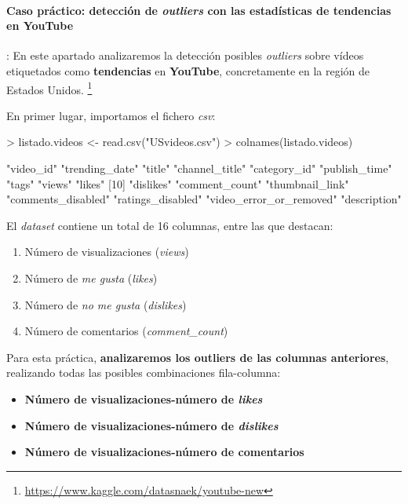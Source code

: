 \documentclass [a4paper] {article}
\begin{document}
\paragraph{Caso práctico: detección de \textit{outliers} con las estadísticas de tendencias en YouTube}: 
En este apartado analizaremos la detección posibles \textit{outliers} sobre vídeos etiquetados como \textbf{tendencias} en \textbf{YouTube}, concretamente en la región de Estados Unidos. \footnote{\url{https://www.kaggle.com/datasnaek/youtube-new}}

En primer lugar, importamos el fichero \textit{csv}:
\begin{Schunk}
\begin{Sinput}
> listado.videos <- read.csv("USvideos.csv")
> colnames(listado.videos)
\end{Sinput}
\begin{Soutput}
 [1] "video_id"               "trending_date"          "title"                  "channel_title"          "category_id"            "publish_time"           "tags"                   "views"                  "likes"                 
[10] "dislikes"               "comment_count"          "thumbnail_link"         "comments_disabled"      "ratings_disabled"       "video_error_or_removed" "description"           
\end{Soutput}
\end{Schunk}

El \textit{dataset} contiene un total de 16 columnas, entre las que destacan:
\begin{enumerate}
  \item Número de visualizaciones (\textit{views})
  \item Número de \textit{me gusta} (\textit{likes})
  \item Número de \textit{no me gusta} (\textit{dislikes})
  \item Número de comentarios (\textit{comment\_count})
\end{enumerate}

Para esta práctica, \textbf{analizaremos los outliers de las columnas anteriores}, realizando todas las posibles combinaciones fila-columna:
\begin{itemize}
  \item \textbf{Número de visualizaciones-número de \textit{likes}}
  \item \textbf{Número de visualizaciones-número de \textit{dislikes}}
  \item \textbf{Número de visualizaciones-número de comentarios}
\end{itemize}
\end{document}
